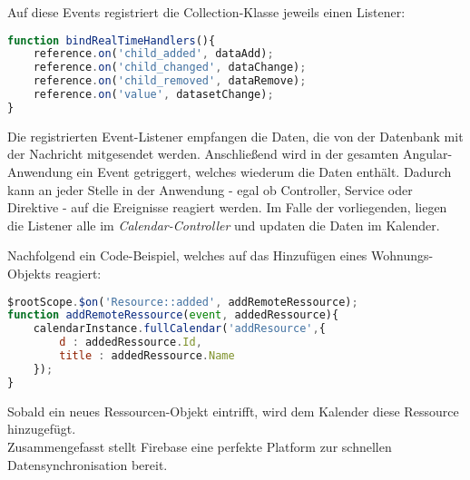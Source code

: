 Auf diese Events registriert die Collection-Klasse jeweils einen Listener:

 \begin{lstlisting}[language=Javascript, label=code_CollectionListenerBnding, caption=Registrierung der Event-Handler von Datnebank-Events]
function bindRealTimeHandlers(){
    reference.on('child_added', dataAdd);
    reference.on('child_changed', dataChange);
    reference.on('child_removed', dataRemove);
    reference.on('value', datasetChange);
}
\end{lstlisting}

Die registrierten Event-Listener empfangen die Daten, die von der Datenbank mit der Nachricht mitgesendet werden.
Anschließend wird in der gesamten Angular-Anwendung ein Event getriggert, welches wiederum die Daten enthält.
Dadurch kann an jeder Stelle in der Anwendung - egal ob Controller, Service oder Direktive - auf die Ereignisse reagiert werden.
Im Falle der vorliegenden, liegen die Listener alle im \textit{Calendar-Controller} und updaten die Daten im Kalender.

Nachfolgend ein Code-Beispiel, welches auf das Hinzufügen eines Wohnungs-Objekts reagiert:

 \begin{lstlisting}[language=Javascript, label=code_CollectionCUtomListener, caption=Event-Handler für hinzukommende Ressourcen]
 $rootScope.$on('Resource::added', addRemoteRessource);
function addRemoteRessource(event, addedRessource){
    calendarInstance.fullCalendar('addResource',{
        d : addedRessource.Id,
        title : addedRessource.Name
    });
}
\end{lstlisting}

Sobald ein neues Ressourcen-Objekt eintrifft, wird dem Kalender diese Ressource hinzugefügt.\\

Zusammengefasst stellt Firebase eine perfekte Platform zur schnellen Datensynchronisation bereit.
